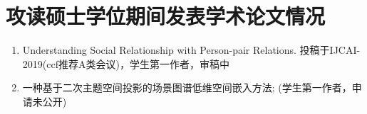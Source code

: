 
\chapter*{攻读硕士学位期间发表学术论文情况}

\begin{enumerate}
	\item Understanding Social Relationship with Person-pair Relations. 投稿于IJCAI-2019(ccf推荐A类会议)，学生第一作者，审稿中
    \item 一种基于二次主题空间投影的场景图谱低维空间嵌入方法; (学生第一作者，申请未公开)
\end{enumerate}


